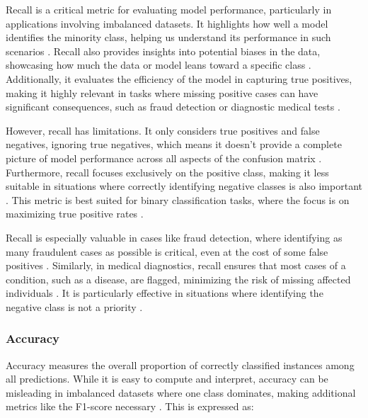 Recall is a critical metric for evaluating model performance, particularly in applications involving imbalanced datasets. It highlights how well a model identifies the minority class, helping us understand its performance in such scenarios \cite{bose_classification_metrics}. Recall also provides insights into potential biases in the data, showcasing how much the data or model leans toward a specific class \cite{bose_classification_metrics}. Additionally, it evaluates the efficiency of the model in capturing true positives, making it highly relevant in tasks where missing positive cases can have significant consequences, such as fraud detection or diagnostic medical tests \cite{appliedai_evaluation_metrics,evidentlyai_accuracy_precision_recall}.

However, recall has limitations. It only considers true positives and false negatives, ignoring true negatives, which means it doesn’t provide a complete picture of model performance across all aspects of the confusion matrix \cite{bose_classification_metrics}. Furthermore, recall focuses exclusively on the positive class, making it less suitable in situations where correctly identifying negative classes is also important \cite{bose_classification_metrics}. This metric is best suited for binary classification tasks, where the focus is on maximizing true positive rates \cite{bose_classification_metrics}.

Recall is especially valuable in cases like fraud detection, where identifying as many fraudulent cases as possible is critical, even at the cost of some false positives \cite{appliedai_evaluation_metrics}. Similarly, in medical diagnostics, recall ensures that most cases of a condition, such as a disease, are flagged, minimizing the risk of missing affected individuals \cite{evidentlyai_accuracy_precision_recall} . It is particularly effective in situations where identifying the negative class is not a priority \cite{bose_classification_metrics} .


\subsubsection{Accuracy}
Accuracy measures the overall proportion of correctly classified instances among all predictions. While it is easy to compute and interpret, accuracy can be misleading in imbalanced datasets where one class dominates, making additional metrics like the F1-score necessary \cite{article, dalianis2018clinical}. This is expressed as: 

